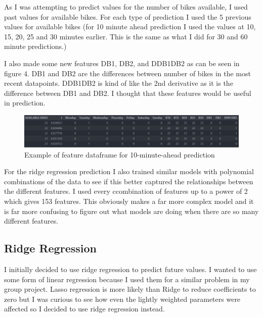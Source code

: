 \par 
As I was attempting to predict values for the number of bikes available,
I used past values for available bikes.
For each type of prediction I used the 5 previous values for available bikes (for 10 minute ahead prediction I used the values at 10, 15, 20, 25 and 30 minutes earlier. This is the same as what I did for 30 and 60 minute predictions.)

\par 
I also made some new features DB1, DB2, and DDB1DB2 as can be seen in figure 4.
DB1 and DB2 are the differences between number of bikes in the most recent datapoints.
DDB1DB2 is kind of like the 2nd derivative as it is the difference between DB1 and DB2.
I thought that these features would be useful in prediction.

\begin{figure}[H]
    \centering
    \includegraphics[width=1\textwidth]{images/example_features.jpg}
    \caption{Example of feature dataframe for 10-minute-ahead prediction}
    \end{figure}
\par 

For the ridge regression prediction I also trained similar models with polynomial combinations of the data to see if this better captured the relationships between the different features.
I used every ccombination of features up to a power of 2 which gives 153 features.
This obviously makes a far more complex model and it is far more confusing to figure out what models are doing when there are so many different features.

\par 


\subsection{Ridge Regression}
I initially decided to use ridge regression to predict future values. 
I wanted to use some form of linear regression because I used them for a similar problem in my group project.
Lasso regression is more likely than Ridge to reduce coefficients to zero but I was curious to see how even the lightly weighted parameters were affected so I decided to use ridge regression instead.
\par 

